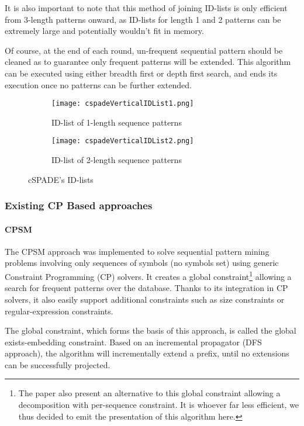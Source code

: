 \documentclass{eplmastersthesis}
\begin{document}
It is also important to note that this method of joining ID-lists is only efficient from 3-length patterns onward, as ID-lists for length 1 and 2 patterns can be extremely large and potentially wouldn't fit in memory. \newline

Of course, at the end of each round, un-frequent sequential pattern should be cleaned as to guarantee only frequent patterns will be extended. This algorithm can be executed using either breadth first or depth first search, and ends its execution once no patterns can be further extended.

\begin{figure}[h]
  \centering
  \begin{subfigure}[t]{0.54\textwidth}
  	\centering
  	\texttt{[image: cspadeVerticalIDList1.png]}
    \caption{ID-list of 1-length sequence patterns}
  \end{subfigure}
  \begin{subfigure}[t]{0.45\textwidth}
  	\centering
    \texttt{[image: cspadeVerticalIDList2.png]}
    \caption{ID-list of 2-length sequence patterns}
  \end{subfigure}
  \caption{cSPADE's ID-lists}
  \label{fig:cspadeIDList}
\end{figure}

\subsubsection{Existing CP Based approaches}
\paragraph{CPSM}

The CPSM approach \cite{negrevergne2015constraint} was implemented to solve sequential pattern mining problems involving only sequences of symbols (no symbols set) using generic Constraint Programming (CP) solvers. It creates a global constraint\footnote{The paper also present an alternative to this global constraint allowing a decomposition with per-sequence constraint. It is whoever far less efficient, we thus decided to emit the presentation of this algorithm here.} allowing a search for frequent patterns over the database. Thanks to its integration in CP solvers, it also easily support additional constraints such as size constraints or regular-expression constraints. \newline

The global constraint, which forms the basis of this approach, is called the global exists-embedding constraint. Based on an incremental propagator (DFS approach), the algorithm will incrementally extend a prefix, until no extensions can be successfully projected. \newline
\end{document}
